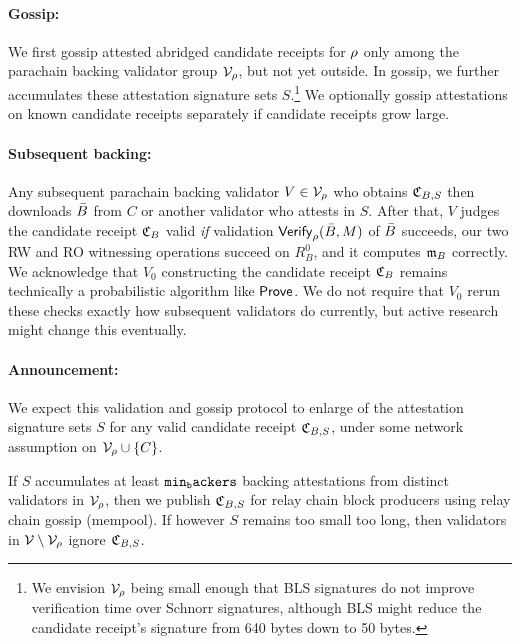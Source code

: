 \smallskip\paragraph{Gossip:}

We first gossip attested abridged candidate receipts for $\rho$ only among the parachain backing validator group $\mathcal{V}_{\rho}$, but not yet outside.
In gossip, we further accumulates these attestation signature sets $S$.\footnote{We envision $\mathcal{V}_{\rho}$ being small enough that BLS signatures do not improve verification time over Schnorr signatures, although BLS might reduce the candidate receipt's signature from 640 bytes down to 50 bytes.}  
We optionally gossip attestations on known candidate receipts separately if candidate receipts grow large.  

\smallskip\paragraph{Subsequent backing:}

Any subsequent parachain backing validator $V \in \mathcal{V}_{\rho}$ who obtains $\mathfrak{C}_{B,S}$ then downloads $\bar{B}$ from $C$ or another validator who attests in $S$.  After that, $V$ judges the candidate receipt $\mathfrak{C}_B$ valid {\em if} validation $\mathsf{Verify}_{\rho}(\bar{B},M)$ of $\bar{B}$ succeeds, our two RW and RO witnessing operations succeed on $R^0_B$, and it computes $\mathfrak{m}_B$ correctly.  
%
We acknowledge that $V_0$ constructing the candidate receipt $\mathfrak{C}_B$ remains technically a probabilistic algorithm like $\mathsf{Prove}$.  We do not require that $V_0$ rerun these checks exactly how subsequent validators do currently, but active research might change this eventually.

\smallskip\paragraph{Announcement:}

We expect this validation and gossip protocol to enlarge of the attestation signature sets $S$ for any valid candidate receipt $\mathfrak{C}_{B,S}$, under some network assumption on $\mathcal{V}_{\rho} \cup \{C\}$.

If $S$ accumulates at least $\mathtt{min_backers}$ backing attestations from distinct validators in $\mathcal{V}_{\rho}$, then we publish $\mathfrak{C}_{B,S}$ for relay chain block producers using relay chain gossip (mempool).
If however $S$ remains too small too long, then validators in $\mathcal{V} \setminus \mathcal{V}_{\rho}$ ignore $\mathfrak{C}_{B,S}$.

